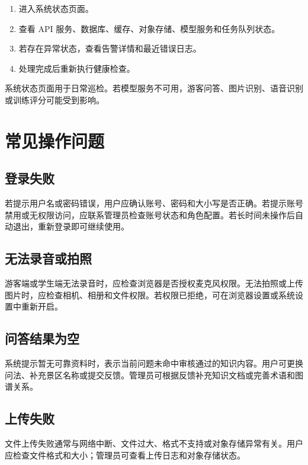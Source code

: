 \begin{enumerate}[leftmargin=2em]
  \item 进入系统状态页面。
  \item 查看 API 服务、数据库、缓存、对象存储、模型服务和任务队列状态。
  \item 若存在异常状态，查看告警详情和最近错误日志。
  \item 处理完成后重新执行健康检查。
\end{enumerate}

系统状态页面用于日常巡检。若模型服务不可用，游客问答、图片识别、语音识别或训练评分可能受到影响。


\section{常见操作问题}

\subsection{登录失败}

若提示用户名或密码错误，用户应确认账号、密码和大小写是否正确。若提示账号禁用或无权限访问，应联系管理员检查账号状态和角色配置。若长时间未操作后自动退出，重新登录即可继续使用。

\subsection{无法录音或拍照}

游客端或学生端无法录音时，应检查浏览器是否授权麦克风权限。无法拍照或上传图片时，应检查相机、相册和文件权限。若权限已拒绝，可在浏览器设置或系统设置中重新开启。

\subsection{问答结果为空}

系统提示暂无可靠资料时，表示当前问题未命中审核通过的知识内容。用户可更换问法、补充景区名称或提交反馈。管理员可根据反馈补充知识文档或完善术语和图谱关系。

\subsection{上传失败}

文件上传失败通常与网络中断、文件过大、格式不支持或对象存储异常有关。用户应检查文件格式和大小；管理员可查看上传日志和对象存储状态。

